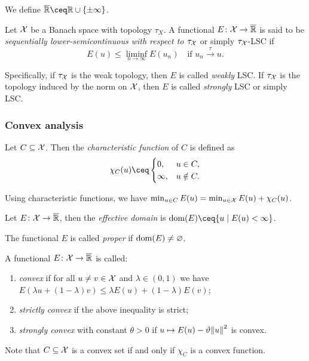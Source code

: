 We define $\rext \ceq \RR\cup \qty{\pm\infty}$. 

\begin{definition}
	Let $\mathcal X$ be a Banach space with topology $\tau_X$. A functional $E \colon \mathcal X \to\overline{\mathbb R}$ is said to be \emph{sequentially lower-semicontinuous with respect to $\tau_\mathcal X$} or simply $\tau_\mathcal X$-LSC if
	\[
	E(u) \leq \liminf_{n\to\infty} E(u_n)\quad\text{if $u_n \overset\tau\to u$}. 
	\]
	
	Specifically, if $\tau_\mathcal X$ is the weak topology, then $E$ is called \emph{weakly} LSC. If $\tau_\mathcal X$ is the topology induced by the norm on $\mathcal X$, then $E$ is called \emph{strongly} LSC or simply LSC.
\end{definition}

\subsubsection{Convex analysis}
\begin{definition}
	Let $C \subseteq \mathcal X$. Then the \emph{characteristic function} of $C$ is defined as 
	\[
	\chi_C(u) \ceq \begin{cases} 0, &u \in C, \\ \infty,& u \notin C. \end{cases}
	\]
\end{definition}
Using characteristic functions, we have $\min_{u \in C} E(u) = \min_{u \in \mathcal X} E(u) + \chi_C(u)$. 

\begin{definition}
	Let $E \colon \mathcal X \to \overline{\mathbb R}$, then the \emph{effective domain} is $\dom(E) \ceq \qty{u \mid E(u) < \infty}$. 
	
	The functional $E$ is called \emph{proper} if $\operatorname{dom}(E) \neq\varnothing$. 
\end{definition}

\begin{definition}
	A functional $E \colon \mathcal X \to \overline{\mathbb R}$ is called:
	\begin{enumerate}
		\item \emph{convex} if for all $u \neq v \in \mathcal X$ and $\lambda \in (0, 1)$ we have $E(\lambda u + (1-\lambda) v) \leq \lambda E(u) + (1-\lambda) E(v)$;
		\item \emph{strictly convex} if the above inequality is strict;
		\item \emph{strongly convex} with constant $\theta > 0$ if $u \mapsto E(u) - \vartheta \norm{u}^2$ is convex. 
	\end{enumerate}

Note that $C \subseteq \mathcal X$ is a convex set if and only if $\chi_C$ is a convex function. 
\end{definition}

